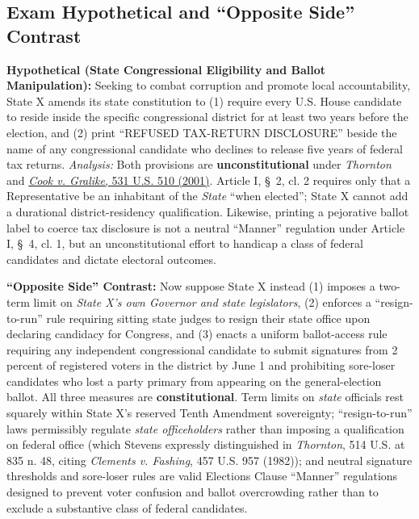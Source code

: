 \documentclass[12pt]{article}
\begin{document}
\subsection{Exam Hypothetical and ``Opposite Side'' Contrast}
\textbf{Hypothetical (State Congressional Eligibility and Ballot Manipulation):} Seeking to combat corruption and promote local accountability, State X amends its state constitution to (1) require every U.S. House candidate to reside inside the specific congressional district for at least two years before the election, and (2) print ``REFUSED TAX-RETURN DISCLOSURE'' beside the name of any congressional candidate who declines to release five years of federal tax returns. \textit{Analysis:} Both provisions are \textbf{unconstitutional} under \textit{Thornton} and \href{https://supreme.justia.com/cases/federal/us/531/510/}{\textit{Cook v. Gralike}, 531 U.S. 510 (2001)}. Article I, \S~2, cl. 2 requires only that a Representative be an inhabitant of the \textit{State} ``when elected''; State X cannot add a durational district-residency qualification. Likewise, printing a pejorative ballot label to coerce tax disclosure is not a neutral ``Manner'' regulation under Article I, \S~4, cl. 1, but an unconstitutional effort to handicap a class of federal candidates and dictate electoral outcomes.

\textbf{``Opposite Side'' Contrast:} Now suppose State X instead (1) imposes a two-term limit on \textit{State X's own Governor and state legislators}, (2) enforces a ``resign-to-run'' rule requiring sitting state judges to resign their state office upon declaring candidacy for Congress, and (3) enacts a uniform ballot-access rule requiring any independent congressional candidate to submit signatures from 2 percent of registered voters in the district by June 1 and prohibiting sore-loser candidates who lost a party primary from appearing on the general-election ballot. All three measures are \textbf{constitutional}. Term limits on \textit{state} officials rest squarely within State X's reserved Tenth Amendment sovereignty; ``resign-to-run'' laws permissibly regulate \textit{state officeholders} rather than imposing a qualification on federal office (which Stevens expressly distinguished in \textit{Thornton}, 514 U.S. at 835 n. 48, citing \textit{Clements v. Fashing}, 457 U.S. 957 (1982)); and neutral signature thresholds and sore-loser rules are valid Elections Clause ``Manner'' regulations designed to prevent voter confusion and ballot overcrowding rather than to exclude a substantive class of federal candidates.
\end{document}
